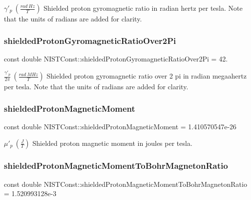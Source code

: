 $\gamma'_p \ (\frac{rad\ Hz}{T})$ Shielded proton gyromagnetic ratio in radian hertz per tesla. Note that the units of radians are added for clarity. \mbox{\label{group___n_i_s_t_const-_proton_ga5b2d223ede8fc141af04cef0486c2c52}} 
\subsubsection{\texorpdfstring{shielded\+Proton\+Gyromagnetic\+Ratio\+Over2\+Pi}{shieldedProtonGyromagneticRatioOver2Pi}}
{\footnotesize\ttfamily const double N\+I\+S\+T\+Const\+::shielded\+Proton\+Gyromagnetic\+Ratio\+Over2\+Pi = 42.}

$\frac{\gamma'_p}{2 \pi} \ (\frac{rad\ MHz}{T})$ Shielded proton gyromagnetic ratio over 2 pi in radian megaahertz per tesla. Note that the units of radians are added for clarity. \mbox{\label{group___n_i_s_t_const-_proton_ga3e2c09881642d47d3e869c7803862e6f}} 
\subsubsection{\texorpdfstring{shielded\+Proton\+Magnetic\+Moment}{shieldedProtonMagneticMoment}}
{\footnotesize\ttfamily const double N\+I\+S\+T\+Const\+::shielded\+Proton\+Magnetic\+Moment = 1.\+410570547e-\/26}

$\mu'_p \ (\frac{J}{T})$ Shielded proton magnetic moment in joules per tesla. \mbox{\label{group___n_i_s_t_const-_proton_ga175eb518370bc31471e8ad763e760b72}} 
\subsubsection{\texorpdfstring{shielded\+Proton\+Magnetic\+Moment\+To\+Bohr\+Magneton\+Ratio}{shieldedProtonMagneticMomentToBohrMagnetonRatio}}
{\footnotesize\ttfamily const double N\+I\+S\+T\+Const\+::shielded\+Proton\+Magnetic\+Moment\+To\+Bohr\+Magneton\+Ratio = 1.\+520993128e-\/3}

